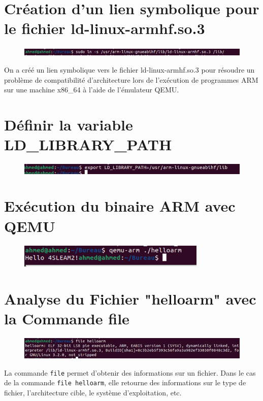 \section{Création d’un lien symbolique pour le fichier ld-linux-armhf.so.3}
\begin{figure}[h]

    \includegraphics[width=1\textwidth]{images/4.png}

\end{figure}
On a créé un lien symbolique vers le fichier ld-linux-armhf.so.3 pour résoudre un problème de compatibilité d'architecture lors de l'exécution de programmes ARM sur une machine x86\_64 à l'aide de l'émulateur QEMU.

\section{Définir la variable LD\_LIBRARY\_PATH }
\begin{figure}[h]

    \includegraphics[width=1\textwidth]{images/5.png}

\end{figure}    
\section{Exécution du binaire ARM avec QEMU}
\begin{figure}[h]

    \includegraphics[width=0.8\textwidth]{images/7.png}

\end{figure}

\section{ Analyse du Fichier "helloarm" avec la Commande file}
\begin{figure}[h]

    \includegraphics[width=1\textwidth]{images/6.png}

\end{figure}
La commande \texttt{file} permet d'obtenir des informations sur un fichier. Dans le cas de la commande \texttt{file helloarm}, elle retourne des informations sur le type de fichier, l'architecture cible, le système d'exploitation, etc.

